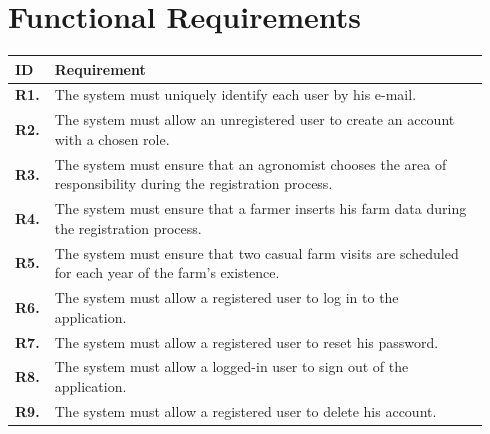 \section{Functional Requirements}

\begin{longtable}{@{}p{0.06\linewidth} p{0.88\linewidth}}
	\toprule
	\textbf{ID}   & \textbf{Requirement}\\
	\midrule
	
	\textbf{R1.} & The system must uniquely identify each user by his e-mail. \\
	\textbf{R2.} & The system must allow an unregistered user to create an account with a chosen role. \\
	\textbf{R3.} & The system must ensure that an agronomist chooses the area of responsibility during the registration process. \\
	\textbf{R4.} & The system must ensure that a farmer inserts his farm data during the registration process.\\
	\textbf{R5.} & The system must ensure that two casual farm visits are scheduled for each year of the farm's existence.\\
	\textbf{R6.} & The system must allow a registered user to log in to the application. \\
	\textbf{R7.} & The system must allow a registered user to reset his password. \\
	\textbf{R8.} & The system must allow a logged-in user to sign out of the application. \\
	\textbf{R9.} & The system must allow a registered user to delete his account. \\
	

\end{longtable}
